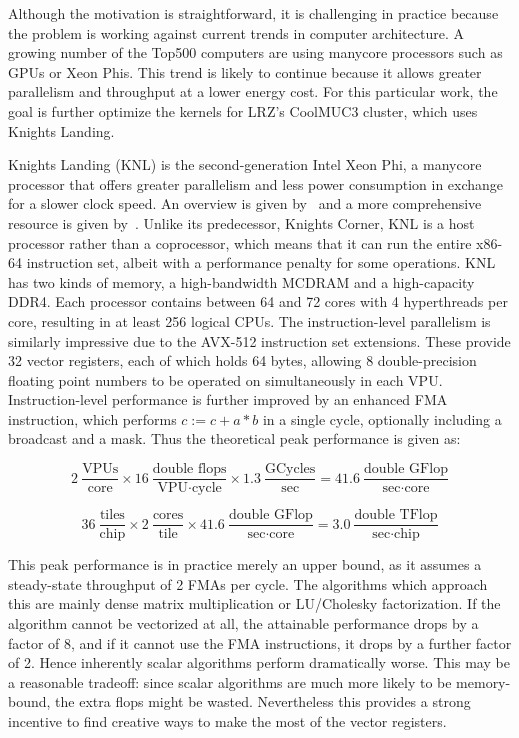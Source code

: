 Although the motivation is straightforward, it is challenging in practice because the problem is working against current trends in computer architecture. A growing number of the Top500 computers are using manycore processors such as GPUs or Xeon Phis. This trend is likely to continue because it allows greater parallelism and throughput at a lower energy cost. For this particular work, the goal is further optimize the kernels for LRZ's CoolMUC3 cluster, which uses Knights Landing.

Knights Landing (KNL) is the second-generation Intel Xeon Phi, a manycore processor that offers greater parallelism and less power consumption in exchange for a slower clock speed. An overview is given by~\cite{Sodani:2016:KLS:2927511.2927563} and a more comprehensive resource is given by~\cite{Jeffers:2016:IXP:3050856}. Unlike its predecessor, Knights Corner, KNL is a host processor rather than a coprocessor, which means that it can run the entire x86-64 instruction set, albeit with a performance penalty for some operations. KNL has two kinds of memory, a high-bandwidth MCDRAM and a high-capacity DDR4. Each processor contains between 64 and 72 cores with 4 hyperthreads per core, resulting in at least 256 logical CPUs. The instruction-level parallelism is similarly impressive due to the AVX-512 instruction set extensions. These provide 32 vector registers, each of which holds 64 bytes, allowing 8 double-precision floating point numbers to be operated on simultaneously in each \gls{VPU}. Instruction-level performance is further improved by an enhanced \gls{FMA} instruction, which performs $c := c + a*b$ in a single cycle, optionally including a broadcast and a mask. Thus the theoretical peak performance is given as:

\[
2~\frac{\text{VPUs}}{\text{core}} \times 16~\frac{\text{double flops}}{\text{VPU} \cdot \text{cycle}} \times 1.3~\frac{\text{GCycles}}{\text{sec}} = 41.6~\frac{\text{double GFlop}}{\text{sec}\cdot \text{core}}
  \label{eq:knl_peak_perf}
\]

\[
36~\frac{\text{tiles}}{\text{chip}} \times 2~\frac{\text{cores}}{\text{tile}} \times 41.6~\frac{\text{double~GFlop}}{\text{sec}\cdot \text{core}} = 3.0~\frac{\text{double TFlop}}{\text{sec}\cdot \text{chip}}
\]

This peak performance is in practice merely an upper bound, as it assumes a steady-state throughput of 2 FMAs per cycle. The algorithms which approach this are mainly dense matrix multiplication or LU/Cholesky factorization. If the algorithm cannot be vectorized at all, the attainable performance drops by a factor of 8, and if it cannot use the FMA instructions, it drops by a further factor of 2. Hence inherently scalar algorithms perform dramatically worse. This may be a reasonable tradeoff: since scalar algorithms are much more likely to be memory-bound, the extra flops might be wasted. Nevertheless this provides a strong incentive to find creative ways to make the most of the vector registers. 

